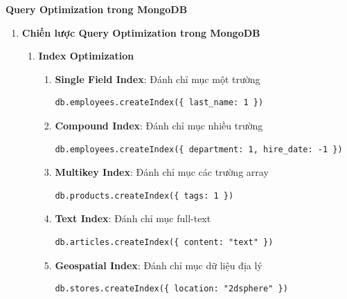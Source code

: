 \textbf{Query Optimization trong MongoDB}

\begin{enumerate}
    \item \textbf{Chiến lược Query Optimization trong MongoDB}
    \begin{enumerate}
        \item \textbf{Index Optimization}
        \begin{enumerate}
        \item \textbf{Single Field Index}: Đánh chỉ mục một trường
        
\begin{lstlisting}[style=mongodb, caption=Ví dụ Single Field Index trong MongoDB, label=mongodb:example]
db.employees.createIndex({ last_name: 1 })
\end{lstlisting}
        
        \item \textbf{Compound Index}: Đánh chỉ mục nhiều trường
        
\begin{lstlisting}[style=mongodb, caption=Ví dụ Compound Index trong MongoDB, label=mongodb:example]
db.employees.createIndex({ department: 1, hire_date: -1 })
\end{lstlisting}
        
        
        \item \textbf{Multikey Index}: Đánh chỉ mục các trường array
        
\begin{lstlisting}[style=mongodb, caption=Ví dụ Multikey Index trong MongoDB, label=mongodb:example]
db.products.createIndex({ tags: 1 })
\end{lstlisting}
        
        \item \textbf{Text Index}: Đánh chỉ mục full-text
        
\begin{lstlisting}[style=mongodb, caption=Ví dụ Text Index trong MongoDB, label=mongodb:example]
db.articles.createIndex({ content: "text" })
\end{lstlisting}
        
        
        \item \textbf{Geospatial Index}: Đánh chỉ mục dữ liệu địa lý
        
\begin{lstlisting}[style=mongodb, caption=Ví dụ Geospatial Index trong MongoDB, label=mongodb:example]
db.stores.createIndex({ location: "2dsphere" })
\end{lstlisting}
        

\end{enumerate}
\end{enumerate}
\end{enumerate}
